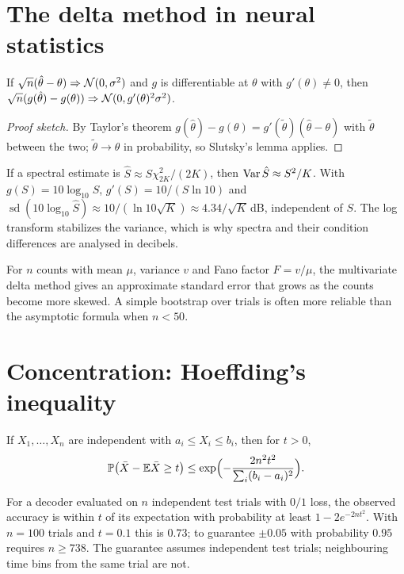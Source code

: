 \section{The delta method in neural statistics}
If $\sqrt n(\hat\theta-\theta)\Rightarrow\mathcal{N}(0,\sigma^2)$ and $g$ is
differentiable at $\theta$ with $g'(\theta)\ne0$, then
$\sqrt n(g(\hat\theta)-g(\theta))\Rightarrow\mathcal{N}(0,g'(\theta)^2\sigma^2)$.
\begin{proof}[Proof sketch]
By Taylor's theorem $g(\hat\theta)-g(\theta)=g'(\tilde\theta)(\hat\theta-\theta)$
with $\tilde\theta$ between the two; $\tilde\theta\to\theta$ in
probability, so Slutsky's lemma applies.
\end{proof}
\begin{example}
If a spectral estimate is $\hat S\approx S\chi^2_{2K}/(2K)$, then
$\operatorname{Var}\hat S\approx S^2/K$. With $g(S)=10\log_{10}S$,
$g'(S)=10/(S\ln10)$ and
$\operatorname{sd}(10\log_{10}\hat S)\approx 10/(\ln10\sqrt K)\approx4.34/\sqrt K$\,dB,
independent of $S$. The log transform stabilizes the variance, which is
why spectra and their condition differences are analysed in decibels.
\end{example}
\begin{example}
For $n$ counts with mean $\mu$, variance $v$ and Fano factor $F=v/\mu$,
the multivariate delta method gives an approximate standard error that
grows as the counts become more skewed. A simple bootstrap over trials is
often more reliable than the asymptotic formula when $n<50$.
\end{example}

\section{Concentration: Hoeffding's inequality}
\begin{theorem}[Hoeffding]
If $X_1,\ldots,X_n$ are independent with $a_i\le X_i\le b_i$, then for $t>0$,
\[
\mathbb{P}\bigl(\bar X-\mathbb{E}\bar X\ge t\bigr)\le\exp\Bigl(-\frac{2n^2t^2}{\sum_i(b_i-a_i)^2}\Bigr).
\]
\end{theorem}
For a decoder evaluated on $n$ independent test trials with $0/1$ loss,
the observed accuracy is within $t$ of its expectation with probability
at least $1-2e^{-2nt^2}$. With $n=100$ trials and $t=0.1$ this is $0.73$;
to guarantee $\pm0.05$ with probability $0.95$ requires $n\ge738$.
The guarantee assumes independent test trials; neighbouring time bins
from the same trial are not.

